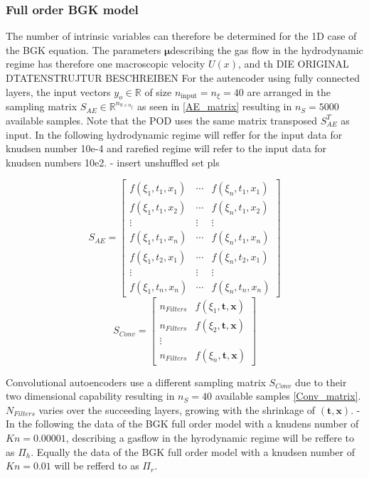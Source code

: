 \documentclass[12pt, a4paper]{article}
\begin{document}
\subsubsection{Full order BGK model}\label{Sec: Data Sampling}
The number of intrinsic variables can therefore be determined for the 1D case of the BGK equation. The parameters \(\mathbf{\mu}\)describing the gas flow in the hydrodynamic regime has therefore one macroscopic velocity \(U(x)\), and th
DIE ORIGINAL DTATENSTRUJTUR BESCHREIBEN
For the autencoder using fully connected layers, the input vectors $y_o \in \mathbb{R}$ of size $n_{\text{input}} = n_{\xi} = 40$ are arranged in the sampling matrix $S_{AE} \in \mathbb{R}^{n_{\mathrm{S}\times n_\xi}}$ as seen in \cref{AE_matrix} resulting in $n_S = 5000$ available samples. Note that the POD uses the same matrix transposed $S_{AE}^T$ as input. In the following hydrodynamic regime will reffer for the input data for knudsen number 10e-4 and rarefied regime will refer to the input data for knudsen numbers 10e2.
- insert unshuffled set pls
\begin{multicols}{2}
	\begin{equation}
	S_{AE} = \begin{bmatrix}
	f(\xi_1,t_1,x_1)&\cdots &f(\xi_n,t_1,x_1) \\
	f(\xi_1,t_1,x_2)&\cdots &f(\xi_n,t_1,x_2) \\
	\vdots& \vdots & \vdots\\
	f(\xi_1,t_1,x_n)&\cdots &f(\xi_n,t_1,x_n)\\
	f(\xi_1,t_2,x_1)&\cdots &f(\xi_n,t_2,x_1)\\
	\vdots & \vdots & \vdots\\
	f(\xi_1,t_n,x_n)&\cdots &f(\xi_n,t_n,x_n)
	\end{bmatrix}
	\label{AE_matrix}
	\end{equation}\break
	\begin{equation}
	S_{Conv}= \begin{bmatrix}
	n_{Filters}&f(\xi_1,\textbf{t},\textbf{x})\\
	n_{Filters}&f(\xi_2,\textbf{t},\textbf{x})\\
	\vdots\\
	n_{Filters}&f(\xi_n,\textbf{t},\textbf{x})
	\end{bmatrix}
	\label{Conv_matrix}
	\end{equation}
\end{multicols}\noindent
Convolutional autoencoders use a different sampling matrix $S_{Conv}$ due to their two dimensional capability resulting in $n_S = 40$ available samples \cref{Conv_matrix}.$N_{Filters}$ varies over the succeeding layers, growing with the shrinkage of $(\textbf{t},\textbf{x})$.
- In the following the data of the BGK full order model with a knudens number of \(Kn = 0.00001\), describing a gasflow in the hyrodynamic regime will be reffere to as \(\Pi_h\). Equally the data of the BGK full order model with a knudsen number of \(Kn = 0.01\) will be refferd to as \(\Pi_r\).
\end{document}
